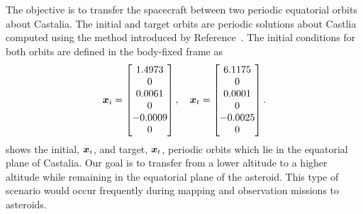 \documentclass[]{aiaa-tc}%
\begin{document}
The objective is to transfer the spacecraft between two periodic equatorial orbits about Castalia.
The initial and target orbits are periodic solutions about Castlia computed using the method introduced by Reference~.
The initial conditions for both orbits are defined in the body-fixed frame as
\begin{align}\label{sec:initial_transfer}
    \bm{x}_i = 
    \begin{bmatrix}
        1.4973 \\ 0 \\ 0.0061 \\ 0\\ -0.0009 \\ 0
    \end{bmatrix} ,
    \quad
    \bm{x}_t =
    \begin{bmatrix}
        6.1175 \\ 0 \\ 0.0001 \\ 0\\ -0.0025 \\ 0
    \end{bmatrix} .
\end{align}
 shows the initial, \( \bm{x}_i \), and target, \( \bm{x}_t\), periodic orbits which lie in the equatorial plane of Castalia.
Our goal is to transfer from a lower altitude to a higher altitude while remaining in the equatorial plane of the asteroid.
This type of scenario would occur frequently during mapping and observation missions to asteroids.
\end{document}
